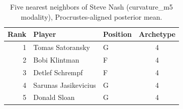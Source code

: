 \begin{table}[htbp]
  \centering\small
  \begin{tabular}{rllc}
    \toprule
    Rank & Player & Position & Archetype \\
    \midrule
    1 & Tomas Satoransky & G & 4 \\
    2 & Bobi Klintman & F & 4 \\
    3 & Detlef Schrempf & F & 4 \\
    4 & Sarunas Jasikevicius & G & 4 \\
    5 & Donald Sloan & G & 4 \\
    \bottomrule
  \end{tabular}
  \caption{Five nearest neighbors of Steve Nash (curvature_m5 modality), Procrustes-aligned posterior mean.}
  \label{tab:Steve_Nash_neighbors_curvature_m5}
\end{table}

